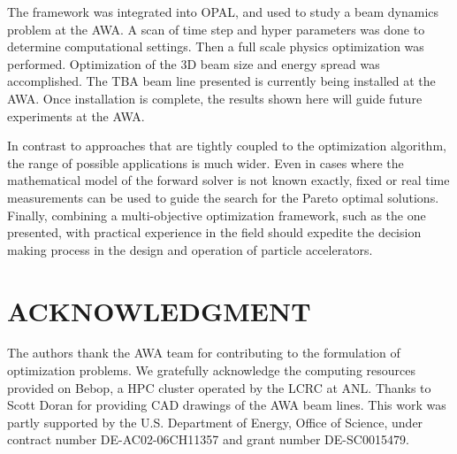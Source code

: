 \documentclass[preprint,linenumbers,amsmath,amssymb,aps,prstab]{revtex4-1}%
\begin{document}
The framework was integrated into OPAL, and used 
to study a beam dynamics problem at the AWA.
A scan of time step and hyper parameters was done to determine computational settings.
Then a full scale physics optimization was performed.
Optimization of the 3D beam size and energy spread was accomplished.
The TBA beam line presented is currently being installed at the AWA.
Once installation is complete, the results shown here will guide future experiments at the AWA.

In contrast to approaches that are tightly coupled to the optimization
algorithm, the range of possible applications is much wider.
Even in cases where the mathematical model of the forward solver is not known
exactly, fixed or real time measurements can be used to guide the
search for the Pareto optimal solutions.
Finally, combining a multi-objective optimization framework, such as 
the one presented, with practical experience in the field should expedite 
the decision making process in the design and operation of particle accelerators.

 
\section{ACKNOWLEDGMENT}

The authors thank the AWA team for contributing to the
  formulation of optimization problems. 
  We gratefully acknowledge the computing resources provided on Bebop,
  a HPC cluster operated by the LCRC at ANL.
  Thanks to Scott Doran for providing CAD drawings of the AWA beam lines.
  This work was partly supported by the 
  U.S. Department of Energy, Office of Science, under 
  contract number DE-AC02-06CH11357 and grant number DE-SC0015479. 
\end{document}
